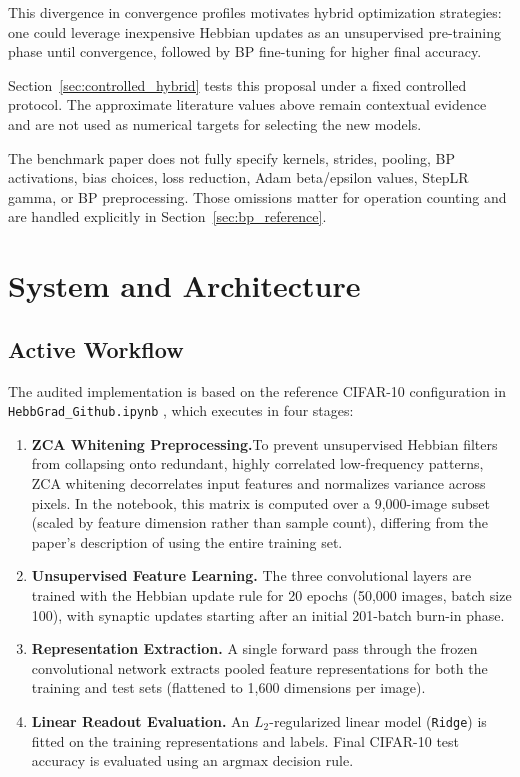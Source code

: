 \documentclass{article}
\begin{document}
    This divergence in convergence profiles motivates hybrid optimization strategies: one could leverage inexpensive Hebbian updates as an unsupervised pre-training phase until convergence, followed by BP fine-tuning for higher final accuracy.

    {\color{red}Section~\ref{sec:controlled_hybrid} tests this proposal under a fixed controlled protocol. The approximate literature values above remain contextual evidence and are not used as numerical targets for selecting the new models.}
    
    The benchmark paper does not fully specify kernels, strides, pooling, BP activations, bias choices, loss reduction, Adam beta/epsilon values, StepLR gamma, or BP preprocessing. Those omissions matter for operation counting and are handled explicitly in Section~\ref{sec:bp_reference}.
    
    \section{System and Architecture}
    
    \subsection{Active Workflow}
    
    The audited implementation is based on the reference CIFAR-10 configuration in \texttt{HebbGrad\_Github.ipynb} \cite{miconi2021repo}, which executes in four stages:
\begin{enumerate}
    \item \textbf{ZCA Whitening Preprocessing.}To prevent unsupervised Hebbian filters from collapsing onto redundant, highly correlated low-frequency patterns, ZCA whitening decorrelates input features and normalizes variance across pixels. In the notebook, this matrix is computed over a 9,000-image subset (scaled by feature dimension rather than sample count), differing from the paper's description of using the entire training set.
    \item \textbf{Unsupervised Feature Learning.} The three convolutional layers are trained with the Hebbian update rule for 20 epochs (50,000 images, batch size 100), with synaptic updates starting after an initial 201-batch burn-in phase.
\item \textbf{Representation Extraction.} A single forward pass through the frozen convolutional network extracts pooled feature representations for both the training and test sets (flattened to 1,600 dimensions per image).
\item \textbf{Linear Readout Evaluation.} An $L_2$-regularized linear model (\texttt{Ridge}) is fitted on the training representations and labels. Final CIFAR-10 test accuracy is evaluated using an $\mathrm{argmax}$ decision rule.
\end{enumerate}
\end{document}
